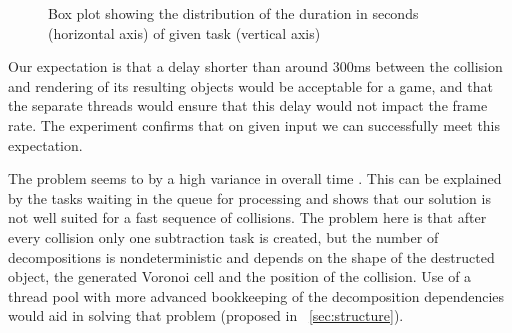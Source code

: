 \begin{figure}
\centering
{}
\caption{Box plot showing the distribution of the duration in seconds (horizontal axis) of given task (vertical axis)}
\label{fig:boxtimes}
\end{figure}



Our expectation is that a delay shorter than around 300ms between the collision and rendering of its resulting objects would be acceptable for a game, and that the separate threads would ensure that this delay would not impact the frame rate. The experiment confirms that on given input we can successfully meet this expectation.

The problem seems to by a high variance in overall time . This can be explained by the tasks waiting in the queue for processing and shows that our solution is not well suited for a fast sequence of collisions. The problem here is that after every collision only one subtraction task is created, but the number of decompositions is nondeterministic and depends on the shape of the destructed object, the generated Voronoi cell and the position of the collision. Use of a thread pool with more advanced bookkeeping of the decomposition dependencies would aid in solving that problem (proposed in ~\cref{sec:structure}).

